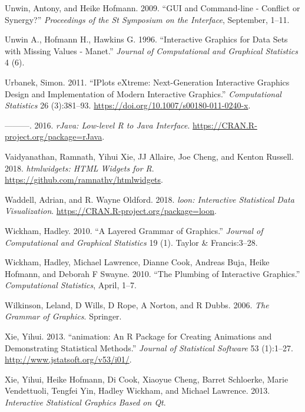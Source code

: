 \documentclass[12pt,]{article}
\theoremstyle{definition}
\theoremstyle{definition}
\theoremstyle{definition}
\theoremstyle{remark}
\begin{document}
\leavevmode\hypertarget{ref-Unwin:1999vp}{}%
Unwin, Antony, and Heike Hofmann. 2009. ``GUI and Command-line -
Conflict or Synergy?'' \emph{Proceedings of the St Symposium on the
Interface}, September, 1--11.

\leavevmode\hypertarget{ref-MANET}{}%
Unwin A., Hofmann H., Hawkins G. 1996. ``Interactive Graphics for Data
Sets with Missing Values - Manet.'' \emph{Journal of Computational and
Graphical Statistics} 4 (6).

\leavevmode\hypertarget{ref-Urbanek2011}{}%
Urbanek, Simon. 2011. ``IPlots eXtreme: Next-Generation Interactive
Graphics Design and Implementation of Modern Interactive Graphics.''
\emph{Computational Statistics} 26 (3):381--93.
\url{https://doi.org/10.1007/s00180-011-0240-x}.

\leavevmode\hypertarget{ref-rJava}{}%
---------. 2016. \emph{rJava: Low-level R to Java Interface}.
\url{https://CRAN.R-project.org/package=rJava}.

\leavevmode\hypertarget{ref-htmlwidgets}{}%
Vaidyanathan, Ramnath, Yihui Xie, JJ Allaire, Joe Cheng, and Kenton
Russell. 2018. \emph{htmlwidgets: HTML Widgets for R}.
\url{https://github.com/ramnathv/htmlwidgets}.

\leavevmode\hypertarget{ref-loon}{}%
Waddell, Adrian, and R. Wayne Oldford. 2018. \emph{loon: Interactive
Statistical Data Visualization}.
\url{https://CRAN.R-project.org/package=loon}.

\leavevmode\hypertarget{ref-ggplot2-paper}{}%
Wickham, Hadley. 2010. ``A Layered Grammar of Graphics.'' \emph{Journal
of Computational and Graphical Statistics} 19 (1). Taylor \&
Francis:3--28.

\leavevmode\hypertarget{ref-plumbing}{}%
Wickham, Hadley, Michael Lawrence, Dianne Cook, Andreas Buja, Heike
Hofmann, and Deborah F Swayne. 2010. ``The Plumbing of Interactive
Graphics.'' \emph{Computational Statistics}, April, 1--7.

\leavevmode\hypertarget{ref-wilkinson}{}%
Wilkinson, Leland, D Wills, D Rope, A Norton, and R Dubbs. 2006.
\emph{The Grammar of Graphics}. Springer.

\leavevmode\hypertarget{ref-animation}{}%
Xie, Yihui. 2013. ``animation: An R Package for Creating Animations and
Demonstrating Statistical Methods.'' \emph{Journal of Statistical
Software} 53 (1):1--27. \url{http://www.jstatsoft.org/v53/i01/}.

\leavevmode\hypertarget{ref-cranvas}{}%
Xie, Yihui, Heike Hofmann, Di Cook, Xiaoyue Cheng, Barret Schloerke,
Marie Vendettuoli, Tengfei Yin, Hadley Wickham, and Michael Lawrence.
2013. \emph{Interactive Statistical Graphics Based on Qt}.
\end{document}
